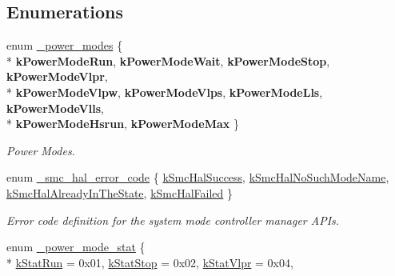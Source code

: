 \subsection*{Enumerations}
\begin{DoxyCompactItemize}
\item 
enum \hyperlink{group__smc__hal_gadd864c409720de3fed5b226fa10e0b2d}{\+\_\+power\+\_\+modes} \{ \\*
{\bfseries k\+Power\+Mode\+Run}, 
{\bfseries k\+Power\+Mode\+Wait}, 
{\bfseries k\+Power\+Mode\+Stop}, 
{\bfseries k\+Power\+Mode\+Vlpr}, 
\\*
{\bfseries k\+Power\+Mode\+Vlpw}, 
{\bfseries k\+Power\+Mode\+Vlps}, 
{\bfseries k\+Power\+Mode\+Lls}, 
{\bfseries k\+Power\+Mode\+Vlls}, 
\\*
{\bfseries k\+Power\+Mode\+Hsrun}, 
{\bfseries k\+Power\+Mode\+Max}
 \}\hypertarget{group__smc__hal_gadd864c409720de3fed5b226fa10e0b2d}{}\label{group__smc__hal_gadd864c409720de3fed5b226fa10e0b2d}
\begin{DoxyCompactList}\small\item\em Power Modes. \end{DoxyCompactList}
\item 
enum \hyperlink{group__smc__hal_gaa517032576fb0e6693a224db2910fdda}{\+\_\+smc\+\_\+hal\+\_\+error\+\_\+code} \{ \hyperlink{group__smc__hal_ggaa517032576fb0e6693a224db2910fddaa3331a6669d92fe24181378a01cd8af02}{k\+Smc\+Hal\+Success}, 
\hyperlink{group__smc__hal_ggaa517032576fb0e6693a224db2910fddaafc775c687502b8a99c6ebfe8407d855f}{k\+Smc\+Hal\+No\+Such\+Mode\+Name}, 
\hyperlink{group__smc__hal_ggaa517032576fb0e6693a224db2910fddaae2287f4b1760f37d8553dd93d48c056d}{k\+Smc\+Hal\+Already\+In\+The\+State}, 
\hyperlink{group__smc__hal_ggaa517032576fb0e6693a224db2910fddaab430f2eaa7006465e6557e546b265736}{k\+Smc\+Hal\+Failed}
 \}\begin{DoxyCompactList}\small\item\em Error code definition for the system mode controller manager A\+P\+Is. \end{DoxyCompactList}
\item 
enum \hyperlink{group__smc__hal_ga50d35fdd2a2912b96e155d3f0dd395a4}{\+\_\+power\+\_\+mode\+\_\+stat} \{ \\*
\hyperlink{group__smc__hal_gga50d35fdd2a2912b96e155d3f0dd395a4aa166ef823ac4247e1a9186053b0b7236}{k\+Stat\+Run} = 0x01, 
\hyperlink{group__smc__hal_gga50d35fdd2a2912b96e155d3f0dd395a4a7b8d683cdb08239d87fc0758930ffd53}{k\+Stat\+Stop} = 0x02, 
\hyperlink{group__smc__hal_gga50d35fdd2a2912b96e155d3f0dd395a4acea8f4d2e5a8a37ff79c5ec4416f29b9}{k\+Stat\+Vlpr} = 0x04, 

\end{DoxyCompactItemize}
